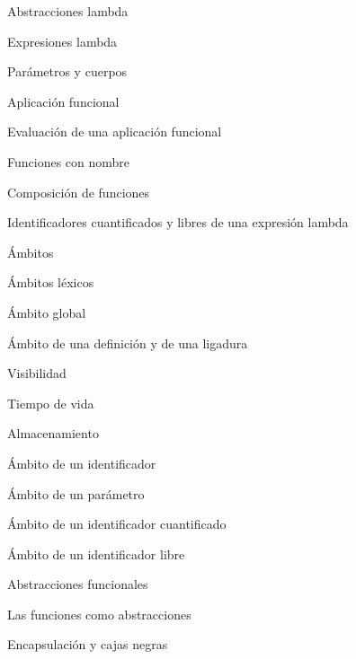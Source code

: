 \begin{longenum}
\begin{longenum}
        \item Abstracciones lambda
        \begin{longenum}
            \item Expresiones lambda
            \item Parámetros y cuerpos
            \item Aplicación funcional
            \begin{longenum}
                \item Evaluación de una aplicación funcional
                \item Funciones con nombre
                \item Composición de funciones
            \end{longenum}
            \item Identificadores cuantificados y libres de una expresión lambda
        \end{longenum}
        \item Ámbitos
        \begin{longenum}
            \item Ámbitos léxicos
            \begin{longenum}
                \item Ámbito global
            \end{longenum}
            \item Ámbito de una definición y de una ligadura
            \begin{longenum}
                \item Visibilidad
                \item Tiempo de vida
                \item Almacenamiento
            \end{longenum}
            \item Ámbito de un identificador
            \item Ámbito de un parámetro
            \item Ámbito de un identificador cuantificado
            \item Ámbito de un identificador libre
        \end{longenum}
        \item Abstracciones funcionales
        \begin{longenum}
            \item Las funciones como abstracciones
            \begin{longenum}
                \item Encapsulación y cajas negras

\end{longenum}
\end{longenum}
\end{longenum}
\end{longenum}
